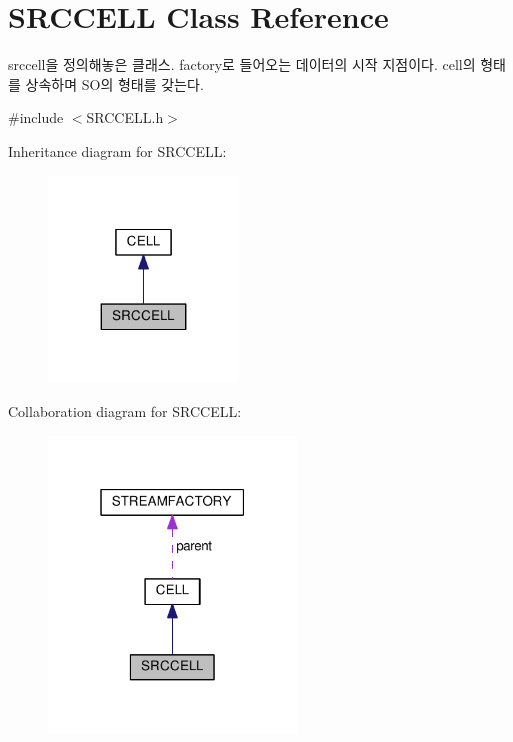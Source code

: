 \hypertarget{classSRCCELL}{}\section{S\+R\+C\+C\+E\+L\+L Class Reference}
\label{classSRCCELL}


srccell을 정의해놓은 클래스. factory로 들어오는 데이터의 시작 지점이다. cell의 형태를 상속하며 S\+O의 형태를 갖는다.  




{\ttfamily \#include $<$S\+R\+C\+C\+E\+L\+L.\+h$>$}



Inheritance diagram for S\+R\+C\+C\+E\+L\+L\+:\nopagebreak
\begin{figure}[H]
\begin{center}
\leavevmode
\includegraphics[width=143pt]{classSRCCELL__inherit__graph}
\end{center}
\end{figure}


Collaboration diagram for S\+R\+C\+C\+E\+L\+L\+:\nopagebreak
\begin{figure}[H]
\begin{center}
\leavevmode
\includegraphics[width=187pt]{classSRCCELL__coll__graph}
\end{center}
\end{figure}
